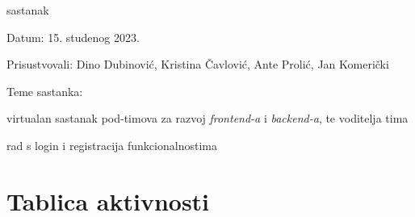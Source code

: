 \begin{packed_enum}
			\item  sastanak
			\item[] \begin{packed_item}
				\item Datum: 15. studenog 2023.
				\item Prisustvovali: Dino Dubinović, Kristina Čavlović, Ante Prolić, Jan Komerički
				\item Teme sastanka:
				\begin{packed_item}
					\item  virtualan sastanak pod-timova za razvoj \textit{frontend-a} i \textit{backend-a}, te voditelja tima
					\item  rad s login i registracija funkcionalnostima
				\end{packed_item}
			\end{packed_item}
			
		\end{packed_enum}
		
		\eject
		\section*{Tablica aktivnosti}
		

